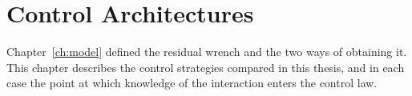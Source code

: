 %
%
%
%
%

\chapter{Control Architectures}
\label{ch:control}

Chapter~\ref{ch:model} defined the residual wrench and the two ways of obtaining it. This
chapter describes the control strategies compared in this thesis, and in each case the point
at which knowledge of the interaction enters the control law.

